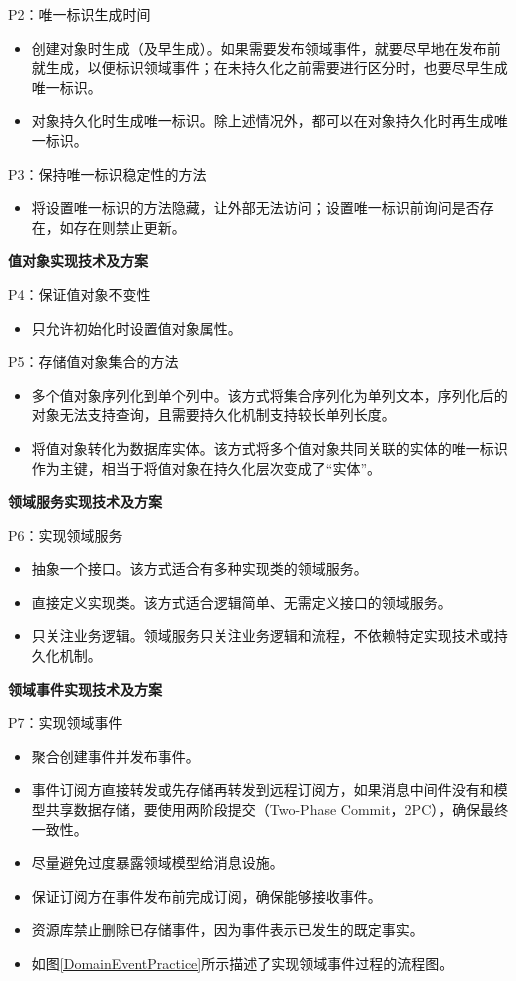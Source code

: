 P2：唯一标识生成时间
\begin{itemize}[leftmargin = 40pt]
    \item 创建对象时生成（及早生成）。如果需要发布领域事件，就要尽早地在发布前就生成，以便标识领域事件；在未持久化之前需要进行区分时，也要尽早生成唯一标识。
    \item 对象持久化时生成唯一标识。除上述情况外，都可以在对象持久化时再生成唯一标识。
\end{itemize}

P3：保持唯一标识稳定性的方法
\begin{itemize}[leftmargin = 40pt]
    \item 将设置唯一标识的方法隐藏，让外部无法访问；设置唯一标识前询问是否存在，如存在则禁止更新。
\end{itemize}

\textbf{值对象实现技术及方案}

P4：保证值对象不变性
\begin{itemize}[leftmargin = 40pt]
    \item 只允许初始化时设置值对象属性。
\end{itemize}

P5：存储值对象集合的方法
\begin{itemize}[leftmargin = 40pt]
    \item 多个值对象序列化到单个列中。该方式将集合序列化为单列文本，序列化后的对象无法支持查询，且需要持久化机制支持较长单列长度。
    \item 将值对象转化为数据库实体。该方式将多个值对象共同关联的实体的唯一标识作为主键，相当于将值对象在持久化层次变成了“实体”。
\end{itemize}

\textbf{领域服务实现技术及方案}

P6：实现领域服务
\begin{itemize}[leftmargin = 40pt]
    \item 抽象一个接口。该方式适合有多种实现类的领域服务。
    \item 直接定义实现类。该方式适合逻辑简单、无需定义接口的领域服务。
    \item 只关注业务逻辑。领域服务只关注业务逻辑和流程，不依赖特定实现技术或持久化机制。
\end{itemize}


\textbf{领域事件实现技术及方案}

P7：实现领域事件

\begin{itemize}[leftmargin = 40pt]
    \item 聚合创建事件并发布事件。
    \item 事件订阅方直接转发或先存储再转发到远程订阅方，如果消息中间件没有和模型共享数据存储，要使用两阶段提交（Two-Phase Commit，2PC），确保最终一致性。
    \item 尽量避免过度暴露领域模型给消息设施。
    \item 保证订阅方在事件发布前完成订阅，确保能够接收事件。
    \item 资源库禁止删除已存储事件，因为事件表示已发生的既定事实。
    \item 如图\ref{DomainEventPractice}所示描述了实现领域事件过程的流程图。
\end{itemize}

